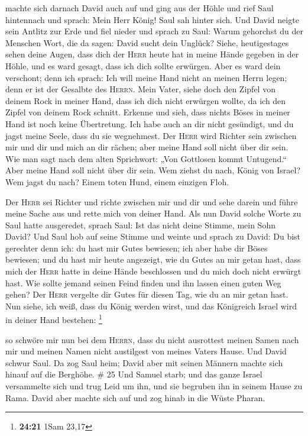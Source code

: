  machte sich darnach David auch auf und ging aus der Höhle
und rief Saul hintennach und sprach: Mein Herr König! Saul sah hinter
sich. Und David neigte sein Antlitz zur Erde und fiel nieder
 und sprach zu Saul: Warum gehorchst du der Menschen
Wort, die da sagen: David sucht dein Unglück?  Siehe,
heutigestages sehen deine Augen, dass dich der \textsc{Herr} heute hat
in meine Hände gegeben in der Höhle, und es ward gesagt, dass ich dich
sollte erwürgen. Aber es ward dein verschont; denn ich sprach: Ich will
meine Hand nicht an meinen Herrn legen; denn er ist der Gesalbte des
\textsc{Herrn}.  Mein Vater, siehe doch den Zipfel von
deinem Rock in meiner Hand, dass ich dich nicht erwürgen wollte, da ich
den Zipfel von deinem Rock schnitt. Erkenne und sieh, dass nichts Böses
in meiner Hand ist noch keine Übertretung. Ich habe auch an dir nicht
gesündigt, und du jagst meine Seele, dass du sie wegnehmest.
 Der \textsc{Herr} wird Richter sein zwischen mir und dir
und mich an dir rächen; aber meine Hand soll nicht über dir sein.
 Wie man sagt nach dem alten Sprichwort: „Von Gottlosen
kommt Untugend.`` Aber meine Hand soll nicht über dir sein.
 Wem ziehst du nach, König von Israel? Wem jagst du nach?
Einem toten Hund, einem einzigen Floh.

 Der \textsc{Herr} sei Richter und richte zwischen mir
und dir und sehe darein und führe meine Sache aus und rette mich von
deiner Hand.  Als nun David solche Worte zu Saul hatte
ausgeredet, sprach Saul: Ist das nicht deine Stimme, mein Sohn David?
Und Saul hob auf seine Stimme und weinte  und sprach zu
David: Du bist gerechter denn ich: du hast mir Gutes bewiesen; ich aber
habe dir Böses bewiesen;  und du hast mir heute
angezeigt, wie du Gutes an mir getan hast, dass mich der \textsc{Herr}
hatte in deine Hände beschlossen und du mich doch nicht erwürgt hast.
 Wie sollte jemand seinen Feind finden und ihn lassen
einen guten Weg gehen? Der \textsc{Herr} vergelte dir Gutes für diesen
Tag, wie du an mir getan hast.  Nun siehe, ich weiß, dass
du König werden wirst, und das Königreich Israel wird in deiner Hand
bestehen: \footnote{\textbf{24:21} 1Sam 23,17}

 so schwöre mir nun bei dem \textsc{Herrn}, dass du nicht
ausrottest meinen Samen nach mir und meinen Namen nicht austilgest von
meines Vaters Hause.  Und David schwur Saul. Da zog Saul
heim; David aber mit seinen Männern machte sich hinauf auf die Berghöhe.
\# 25  Und Samuel starb; und das ganze Israel versammelte
sich und trug Leid um ihn, und sie begruben ihn in seinem Hause zu Rama.
David aber machte sich auf und zog hinab in die Wüste Pharan.

